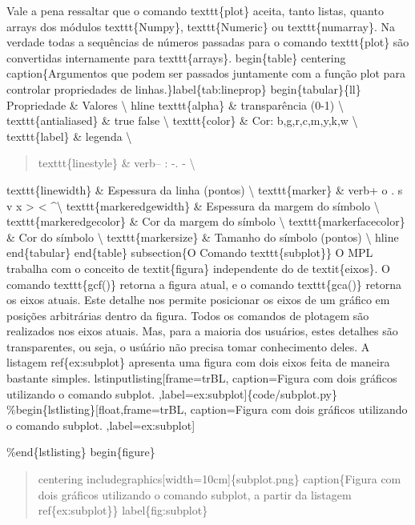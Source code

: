 \documentclass[a4paper,10pt,portuguese]{sphinxmanual}
\begin{document}
Vale a pena ressaltar que o comando texttt\{plot\} aceita, tanto listas, quanto arrays dos módulos texttt\{Numpy\}, texttt\{Numeric\} ou texttt\{numarray\}. Na verdade todas a sequências de números passadas para o comando texttt\{plot\} são convertidas internamente para texttt\{arrays\}.
begin\{table\}
centering
caption\{Argumentos que podem ser passados juntamente com a função plot para controlar propriedades de linhas.\}label\{tab:lineprop\}
begin\{tabular\}\{l\textbar{}l\}
Propriedade \& Valores \textbackslash{}
hline
texttt\{alpha\} \& transparência (0-1) \textbackslash{}
texttt\{antialiased\} \& true \textbar{} false \textbackslash{}
texttt\{color\} \& Cor: b,g,r,c,m,y,k,w \textbackslash{}
texttt\{label\} \& legenda \textbackslash{}
\begin{quote}

texttt\{linestyle\} \& verb\textbar{}-- : -. -\textbar{} \textbackslash{}
\end{quote}

texttt\{linewidth\} \& Espessura da linha (pontos) \textbackslash{}
texttt\{marker\} \& verb\textbar{}+ o . s v x \textgreater{} \textless{} \textasciicircum{}\textbar{}\textbackslash{}
texttt\{markeredgewidth\} \& Espessura da margem do símbolo \textbackslash{}
texttt\{markeredgecolor\} \& Cor da margem do símbolo \textbackslash{}
texttt\{markerfacecolor\} \& Cor do símbolo \textbackslash{}
texttt\{markersize\} \& Tamanho do símbolo (pontos) \textbackslash{}
hline
end\{tabular\}
end\{table\}
subsection\{O Comando texttt\{subplot\}\}
O MPL trabalha com o conceito de textit\{figura\} independente do de textit\{eixos\}. O comando texttt\{gcf()\} retorna a figura atual, e o comando texttt\{gca()\} retorna os eixos atuais. Este detalhe nos permite posicionar os eixos de um gráfico em posições arbitrárias dentro da figura. Todos os comandos de plotagem são realizados nos eixos atuais. Mas, para a maioria dos usuários, estes detalhes são transparentes, ou seja, o usúário não precisa tomar conhecimento deles. A listagem ref\{ex:subplot\} apresenta uma figura com dois eixos feita de maneira bastante simples.
lstinputlisting{[}frame=trBL, caption=Figura com dois gráficos utilizando o comando subplot. ,label=ex:subplot{]}\{code/subplot.py\}
\%begin\{lstlisting\}{[}float,frame=trBL, caption=Figura com dois gráficos utilizando o comando subplot. ,label=ex:subplot{]}

\%end\{lstlisting\}
begin\{figure\}
\begin{quote}

centering
includegraphics{[}width=10cm{]}\{subplot.png\}
caption\{Figura com dois gráficos utilizando o comando subplot, a partir da listagem ref\{ex:subplot\}\}
label\{fig:subplot\}
\end{quote}
\end{document}
